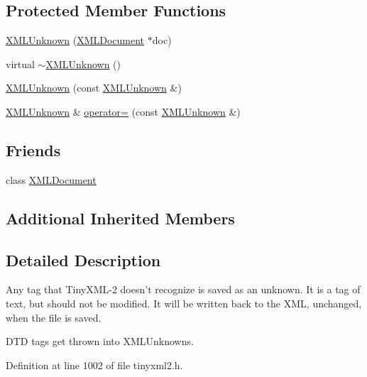 \subsection*{Protected Member Functions}
\begin{DoxyCompactItemize}
\item 
\hyperlink{classtinyxml2_1_1_x_m_l_unknown_a9391eb679598d50baba424e6f1aa367b}{X\+M\+L\+Unknown} (\hyperlink{classtinyxml2_1_1_x_m_l_document}{X\+M\+L\+Document} $\ast$doc)
\item 
virtual \hyperlink{classtinyxml2_1_1_x_m_l_unknown_a86fcd722ca173a7f385bafafa879f26e}{$\sim$\+X\+M\+L\+Unknown} ()
\item 
\hyperlink{classtinyxml2_1_1_x_m_l_unknown_aab31a93c95a7cedc9597cea7caffa73f}{X\+M\+L\+Unknown} (const \hyperlink{classtinyxml2_1_1_x_m_l_unknown}{X\+M\+L\+Unknown} \&)
\item 
\hyperlink{classtinyxml2_1_1_x_m_l_unknown}{X\+M\+L\+Unknown} \& \hyperlink{classtinyxml2_1_1_x_m_l_unknown_a6137d5611db42c35de3d869f66555e5b}{operator=} (const \hyperlink{classtinyxml2_1_1_x_m_l_unknown}{X\+M\+L\+Unknown} \&)
\end{DoxyCompactItemize}
\subsection*{Friends}
\begin{DoxyCompactItemize}
\item 
class \hyperlink{classtinyxml2_1_1_x_m_l_unknown_a4eee3bda60c60a30e4e8cd4ea91c4c6e}{X\+M\+L\+Document}
\end{DoxyCompactItemize}
\subsection*{Additional Inherited Members}


\subsection{Detailed Description}
Any tag that Tiny\+X\+M\+L-\/2 doesn't recognize is saved as an unknown. It is a tag of text, but should not be modified. It will be written back to the X\+M\+L, unchanged, when the file is saved.

D\+T\+D tags get thrown into X\+M\+L\+Unknowns. 

Definition at line 1002 of file tinyxml2.\+h.



